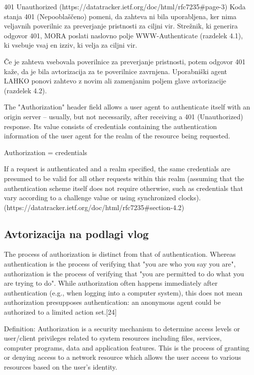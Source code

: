 \documentclass[a4paper, 12pt]{book}
\begin{document}
401 Unauthorized (https://datatracker.ietf.org/doc/html/rfc7235#page-3)
Koda stanja 401 (Nepooblaščeno) pomeni, da zahteva ni bila uporabljena, ker nima veljavnih poverilnic za preverjanje pristnosti za ciljni vir. Strežnik, ki generira odgovor 401, MORA poslati naslovno polje WWW-Authenticate (razdelek 4.1), ki vsebuje vsaj en izziv, ki velja za ciljni vir.

Če je zahteva vsebovala poverilnice za preverjanje pristnosti, potem odgovor 401 kaže, da je bila avtorizacija za te poverilnice zavrnjena. Uporabniški agent LAHKO ponovi zahtevo z novim ali zamenjanim poljem glave avtorizacije (razdelek 4.2).

The "Authorization" header field allows a user agent to authenticate itself with an origin server -- usually, but not necessarily, after receiving a 401 (Unauthorized) response.  Its value consists of credentials containing the authentication information of the user agent for the realm of the resource being requested.

Authorization = credentials

If a request is authenticated and a realm specified, the same credentials are presumed to be valid for all other requests within this realm (assuming that the authentication scheme itself does not require otherwise, such as credentials that vary according to a challenge value or using synchronized clocks). (https://datatracker.ietf.org/doc/html/rfc7235#section-4.2)

\subsection{Avtorizacija na podlagi vlog}

The process of authorization is distinct from that of authentication. Whereas authentication is the process of verifying that "you are who you say you are", authorization is the process of verifying that "you are permitted to do what you are trying to do". While authorization often happens immediately after authentication (e.g., when logging into a computer system), this does not mean authorization presupposes authentication: an anonymous agent could be authorized to a limited action set.[24]


Definition: Authorization is a security mechanism to determine access levels or user/client privileges related to system resources including files, services, computer programs, data and application features. This is the process of granting or denying access to a network resource which allows the user access to various resources based on the user's identity.
\end{document}
